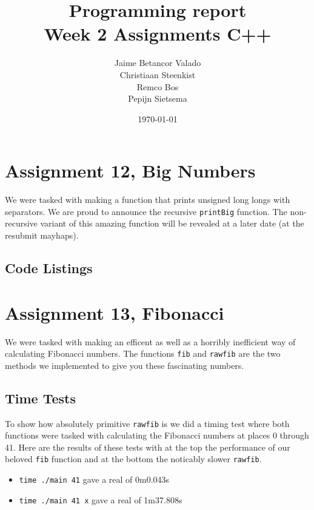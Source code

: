 \documentclass[a4paper]{article}
\begin{document}
\title{Programming report \\
       Week 2 Assignments C++
}
\date{\today}
\author{Jaime Betancor Valado \\
Christiaan Steenkist \\
Remco Bos \\
Pepijn Sietsema
}

\maketitle

\section*{Assignment 12, Big Numbers}
We were tasked with making a function that prints unsigned long longs with separators.
We are proud to announce the recursive \texttt{printBig} function.
The non-recursive variant of this amazing function will be revealed at a later date (at the resubmit mayhaps).

\subsection*{Code Listings}





\section*{Assignment 13, Fibonacci}
We were tasked with making an efficent as well as a horribly inefficient way of calculating Fibonacci numbers.
The functions \texttt{fib} and \texttt{rawfib} are the two methods we implemented to give you these fascinating numbers.

\subsection*{Time Tests}
To show how absolutely primitive \texttt{rawfib} is we did a timing test where both functions were tasked with calculating the Fibonacci numbers at places 0 through 41. Here are the results of these tests with at the top the performance of our beloved \texttt{fib} function and at the bottom the noticably slower \texttt{rawfib}.

\begin{itemize}
\item \texttt{time ./main 41} gave a real of 0m0.043s
\item \texttt{time ./main 41 x} gave a real of 1m37.808s
\end{itemize}
\end{document}
